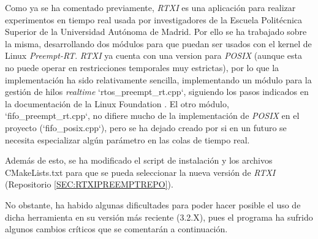 Como ya se ha comentado previamente, \textit{RTXI} es una aplicación para realizar experimentos en tiempo real usada por investigadores de la Escuela Politécnica Superior de la Universidad Autónoma de Madrid. Por ello se ha trabajado sobre la misma, desarrollando dos módulos para que puedan ser usados con el kernel de Linux \textit{Preempt-RT}. \textit{RTXI} ya cuenta con una version para \textit{POSIX} (aunque esta no puede operar en restricciones temporales muy estrictas), por lo que la implementación ha sido relativamente sencilla, implementando un módulo para la gestión de hilos \textit{realtime} `rtos\_preempt\_rt.cpp`, siguiendo los pasos indicados en la documentación de la Linux Foundation \cite{TheLinuxFundation2023}. El otro módulo, `fifo\_preempt\_rt.cpp`, no difiere mucho de la implementación de \textit{POSIX} en el proyecto (`fifo\_posix.cpp`), pero se ha dejado creado por si en un futuro se necesita especializar algún parámetro en las colas de tiempo real.

Además de esto, se ha modificado el script de instalación y los archivos CMakeLists.txt para que se pueda seleccionar la nueva versión de \textit{RTXI} (Repositorio \ref{SEC:RTXIPREEMPTREPO}). 

No obstante, ha habido algunas dificultades para poder hacer posible el uso de dicha herramienta en su versión más reciente (3.2.X), pues el programa ha sufrido algunos cambios críticos que se comentarán a continuación.
